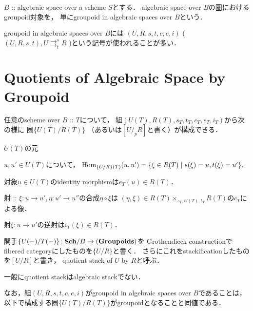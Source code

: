 \documentclass[a4paper, dvipdfmx]{jsarticle}
\newcommand{\parto}[2]{\mathrel{\mathop{\rightrightarrows}^{#1}_{#2}}}
\begin{document}
\begin{Def}
    $B$ :: algebraic space over a scheme $S$とする．
    algebraic space over $B$の圏におけるgroupoid対象を，
    単にgroupoid in algebraic spaces over $B$という．
\end{Def}

groupoid in algebraic spaces over $B$には
$(U, R, s,t,c,e,i)$ ( $(U, R, s,t), U \parto{s}{t} R$ )という記号が使われることが多い．

\section{Quotients of Algebraic Space by Groupoid}
\begin{Def}
    任意のscheme over $B$ :: $T$について，
    組$(U(T), R(T), s_T, t_T, c_T, e_T, i_T)$から次の様に
    圏$\{U(T)/R(T)\}$ （あるいは$[U/_pR]$と書く）が構成できる．
    \begin{description}[labelindent=0.5cm, leftmargin=1.5cm]
        \item[Object] \mnewline
            $U(T)$の元

        \item[Arrow] \mnewline
            $u, u' \in U(T)$について，
            $\operatorname{Hom}_{\{U/R\}(T)}(u, u')=\{\xi \in R(T) \mid s(\xi)=u, t(\xi)=u' \}.$

        \item[Identity Morphism] \mnewline
            対象$u \in U(T)$のidentity morphismは$e_T(u) \in R(T)$．

        \item[Composition of Morphisms] \mnewline
            射 :: $\xi \colon u \to u', \eta \colon u' \to u''$の合成$\eta \circ \xi$は
            $(\eta, \xi) \in R(T) \times_{s_T, U(T), t_T} R(T)$の$c_T$による像．

        \item[Inverse Morphism] \mnewline
            射$\xi \colon u \to u'$の逆射は$i_T(\xi) \in R(T)$．
    \end{description}

    関手$\{U(-)/T(-)\} \colon \mathbf{Sch}/B \to (\mathbf{Groupoids})$を
    Grothendieck constructionでfibered categoryにしたものを$\{U/R\}$と書く．
    さらにこれをstackificationしたものを$[U/R]$と書き，
    quotient stack of $U$ by $R$と呼ぶ．
\end{Def}

一般にquotient stackはalgebraic stackでない．

なお，組$(U,R,s,t,c,e,i)$がgroupoid in algebraic spaces over $B$であることは，
以下で構成する圏$\{U(T)/R(T)\}$がgroupoidとなることと同値である．
\end{document}
